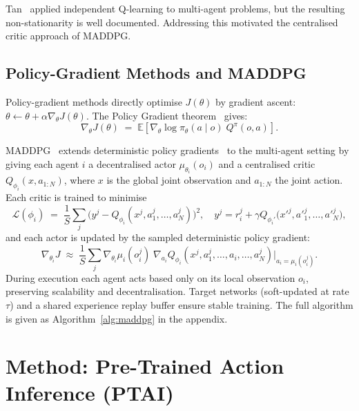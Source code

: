 \documentclass[12pt]{article}
\begin{document}
Tan~\cite{tan1993multi} applied independent Q-learning to multi-agent problems, but the
resulting non-stationarity is well documented. Addressing this motivated the centralised
critic approach of MADDPG.

\subsection{Policy-Gradient Methods and MADDPG}

Policy-gradient methods directly optimise $J(\theta)$ by gradient ascent:
$\theta \leftarrow \theta + \alpha \nabla_\theta J(\theta)$.
The Policy Gradient theorem~\cite{sutton1999policy} gives:
\begin{equation}
\nabla_\theta J(\theta) \;=\; \mathbb{E}\!\left[\nabla_\theta \log \pi_\theta(a \mid o)\; Q^\pi(o, a)\right].
\end{equation}

MADDPG~\cite{lowe2017multi} extends deterministic policy gradients~\cite{silver2014deterministic}
to the multi-agent setting by giving each agent $i$ a decentralised actor $\mu_{\theta_i}(o_i)$
and a centralised critic $Q_{\phi_i}(x, a_{1:N})$, where $x$ is the global joint observation and
$a_{1:N}$ the joint action. Each critic is trained to minimise
\begin{equation}
\mathcal{L}(\phi_i) \;=\; \frac{1}{S}\sum_j
  \bigl(y^j - Q_{\phi_i}(x^j, a^j_1, \ldots, a^j_N)\bigr)^2, \quad
y^j = r^j_i + \gamma Q_{\phi_i'}\!\bigl(x'^j, a'^j_1, \ldots, a'^j_N\bigr),
\label{eq:critic_loss}
\end{equation}
and each actor is updated by the sampled deterministic policy gradient:
\begin{equation}
\nabla_{\theta_i} J \;\approx\; \frac{1}{S}\sum_j
  \nabla_{\theta_i} \mu_i(o^j_i)\;
  \nabla_{a_i} Q_{\phi_i}(x^j, a^j_1, \ldots, a_i, \ldots, a^j_N)
  \Big|_{a_i = \mu_i(o^j_i)}.
\label{eq:actor_grad}
\end{equation}
During execution each agent acts based only on its local observation $o_i$, preserving
scalability and decentralisation. Target networks (soft-updated at rate $\tau$) and a
shared experience replay buffer ensure stable training. The full algorithm is given as
Algorithm~\ref{alg:maddpg} in the appendix.

\section{Method: Pre-Trained Action Inference (PTAI)}
\end{document}
